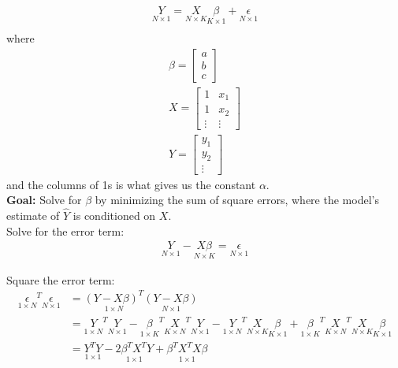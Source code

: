 \documentclass{article}
\begin{document}
\begin{align}
    \underset{N \times 1} Y = \underset{N \times K } X 
                              \underset{K \times 1} \beta +  \underset{ N \times 1} \epsilon\\
\end{align} 
where 
\begin{align}
    \beta = \begin{bmatrix}
        a\\
        b\\
        c
    \end{bmatrix}\\
    X = \begin{bmatrix}
        1 & x_1\\
        1 & x_2\\
        \vdots & \vdots
    \end{bmatrix}\\
    Y = \begin{bmatrix}
        y_1\\
        y_2\\
        \vdots
    \end{bmatrix}
\end{align}
and the columns of 1s is what gives us the constant $\alpha$.\\

\textbf{Goal:} Solve for $\beta$ by minimizing the sum of square errors, where the model's estimate of $\hat Y$ is conditioned on $X$. \\

Solve for the error term:
\begin{align}
    \underset{N \times 1} Y - \underset{N \times K}{X \beta} = \underset{N \times 1} \epsilon
\end{align}

Square the error term:
\begin{align}
    \underset{1 \times N} \epsilon^T  \underset{N \times 1}\epsilon &= 
        \underset{1 \times N}{(Y - X \beta)^T} \underset{N \times 1}{(Y - X \beta)} \\
    &= \underset{1 \times N}Y^T \underset{N \times 1} Y - \underset{1 \times K} \beta^T \underset{K \times N} X^T \underset{N \times 1} Y - \underset{1 \times N} Y^T \underset{N \times K} X \underset{K \times 1}\beta + \underset{1 \times K}\beta^T \underset{K \times N}X^T \underset{N \times K}X \underset{K \times 1}\beta\\
    &= \underset{1 \times 1}{Y^T Y} - \underset{1 \times 1}{2 \beta^T X^T Y} + \underset{1 \times 1}{\beta^T X^T X \beta}
\end{align}
\end{document}
